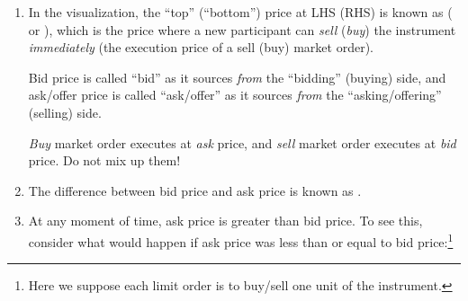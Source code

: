 \begin{enumerate}
\item In the visualization, the ``top'' (``bottom'') price at LHS (RHS) is
known as  ( or ), which is
the price where a new participant  can \emph{sell} (\emph{buy}) the
instrument \emph{immediately} (the execution price of a sell (buy) market
order).

\begin{note}
Bid price is called ``bid'' as it sources \emph{from} the ``bidding'' (buying)
side, and ask/offer price is called ``ask/offer'' as it sources \emph{from} the
``asking/offering'' (selling) side.
\end{note}

\begin{warning}
\emph{Buy} market order executes at \emph{ask} price, and \emph{sell} market
order executes at \emph{bid} price. Do not mix up them!
\end{warning}

\item The difference between bid price and ask price is known as .

\item At any moment of time, ask price is greater than bid price. To see this,
consider what would happen if ask price was less than or equal to bid
price:\footnote{Here we suppose each limit order is to buy/sell one unit of the
instrument.}
\begin{center}
\end{center}
\end{enumerate}
